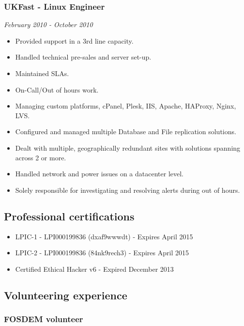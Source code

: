 \subsubsection{UKFast - Linux Engineer}\label{ukfast---linux-engineer}

\emph{February 2010 - October 2010}

\begin{itemize}
\itemsep1pt\parskip0pt
\item
  Provided support in a 3rd line capacity.
\item
  Handled technical pre-sales and server set-up.
\item
  Maintained SLAs.
\item
  On-Call/Out of hours work.
\item
  Managing custom platforms, cPanel, Plesk, IIS, Apache, HAProxy, Nginx,
  LVS.
\item
  Configured and managed multiple Database and File replication
  solutions.
\item
  Dealt with multiple, geographically redundant sites with solutions
  spanning across 2 or more.
\item
  Handled network and power issues on a datacenter level.
\item
  Solely responsible for investigating and resolving alerts during out
  of hours.
\end{itemize}

\subsection{Professional
certifications}\label{professional-certifications}

\begin{itemize}
\itemsep1pt\parskip0pt
\item
  LPIC-1 - LPI000199836 (dxaf9wwwdt) - Expires April 2015
\item
  LPIC-2 - LPI000199836 (84nk9rech3) - Expires April 2015
\item
  Certified Ethical Hacker v6 - Expired December 2013
\end{itemize}

\subsection{Volunteering experience}\label{volunteering-experience}

\subsubsection{FOSDEM volunteer}\label{fosdem-volunteer}

